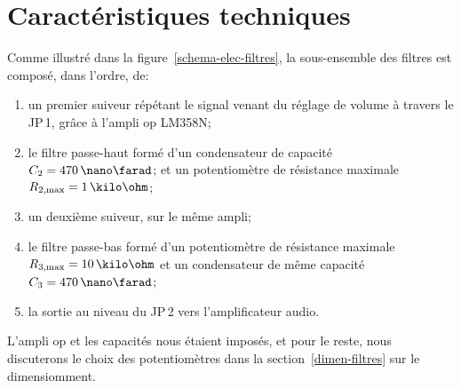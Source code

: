 \section{Caractéristiques techniques}

Comme illustré dans la figure~\ref{schema-elec-filtres},
la sous-ensemble des filtres est composé, dans l'ordre, de:
\begin{enumerate}
    \item un premier suiveur répétant le signal venant du réglage de volume
        à travers le JP\,1, grâce à l'ampli op LM358N;
    \item le filtre passe-haut formé d'un
        condensateur de capacité $C_2 = 470\,\nano\farad$;
        et un potentiomètre de résistance
        maximale $R\ind{2,max} = 1\,\kilo\ohm$;
    \item un deuxième suiveur, sur le même ampli;
    \item le filtre passe-bas formé d'un potentiomètre de résistance
        maximale $R\ind{3,max} = 10\,\kilo\ohm$
        et un condensateur de même capacité $C_3 = 470\,\nano\farad$;
    \item la sortie au niveau du JP\,2 vers l'amplificateur audio.
\end{enumerate}


L'ampli op et les capacités nous étaient imposés,
et pour le reste, nous discuterons le choix des potentiomètres dans
la section~\ref{dimen-filtres} sur le dimensiomment.
